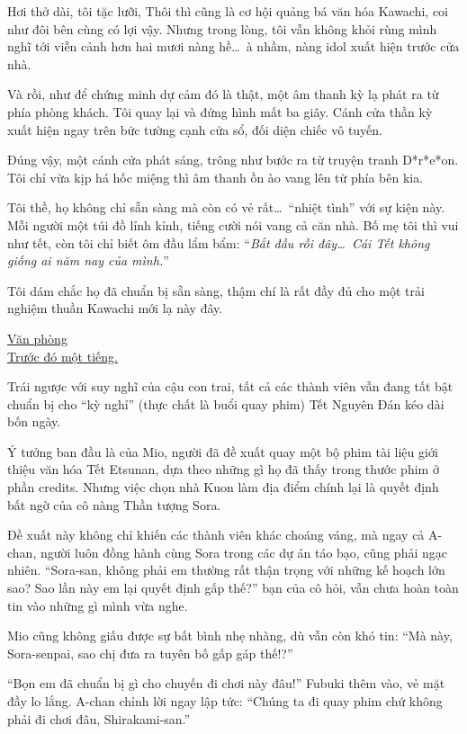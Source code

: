 \documentclass[../main.tex]{subfiles}
\begin{document}
Hơi thở dài, tôi tặc lưỡi, Thôi thì cũng là cơ hội quảng bá văn hóa Kawachi, coi như đôi bên cùng có lợi vậy. Nhưng trong lòng, tôi vẫn không khỏi rùng mình nghĩ tới viễn cảnh hơn hai mươi nàng hề\dots\ à nhầm, nàng idol xuất hiện trước cửa nhà.

Và rồi, như để chứng minh dự cảm đó là thật, một âm thanh kỳ lạ phát ra từ phía phòng khách. Tôi quay lại và đứng hình mất ba giây. Cánh cửa thần kỳ xuất hiện ngay trên bức tường cạnh cửa sổ, đối diện chiếc vô tuyến.

Đúng vậy, một cánh cửa phát sáng, trông như bước ra từ truyện tranh D*r*e*on. Tôi chỉ vừa kịp há hốc miệng thì âm thanh ồn ào vang lên từ phía bên kia.

Tôi thề, họ không chỉ sẵn sàng mà còn có vẻ rất\dots\ ``nhiệt tình'' với sự kiện này. Mỗi người một túi đồ lỉnh kỉnh, tiếng cười nói vang cả căn nhà. Bố mẹ tôi thì vui như tết, còn tôi chỉ biết ôm đầu lẩm bẩm: ``\textit{Bắt đầu rồi đây\dots\ Cái Tết không giống ai năm nay của mình.}''

Tôi dám chắc họ đã chuẩn bị sẵn sàng, thậm chí là rất đầy đủ cho một trải nghiệm thuần Kawachi mới lạ này đây.

\il

\begin{center}
    \pov{-}
    \uline{Văn phòng\\Trước đó một tiếng.}
\end{center}

Trái ngược với suy nghĩ của cậu con trai, tất cả các thành viên vẫn đang tất bật chuẩn bị cho ``kỳ nghỉ'' (thực chất là buổi quay phim) Tết Nguyên Đán kéo dài bốn ngày.

Ý tưởng ban đầu là của Mio, người đã đề xuất quay một bộ phim tài liệu giới thiệu văn hóa Tết Etsunan, dựa theo những gì họ đã thấy trong thước phim ở phần credits. Nhưng việc chọn nhà Kuon làm địa điểm chính lại là quyết định bất ngờ của cô nàng Thần tượng Sora.

Đề xuất này không chỉ khiến các thành viên khác choáng váng, mà ngay cả A-chan, người luôn đồng hành cùng Sora trong các dự án táo bạo, cũng phải ngạc nhiên. ``Sora-san, không phải em thường rất thận trọng với những kế hoạch lớn sao? Sao lần này em lại quyết định gấp thế?'' bạn của cô hỏi, vẫn chưa hoàn toàn tin vào những gì mình vừa nghe.

Mio cũng không giấu được sự bất bình nhẹ nhàng, dù vẫn còn khó tin: ``Mà này, Sora-senpai, sao chị đưa ra tuyên bố gấp gáp thế!?''

``Bọn em đã chuẩn bị gì cho chuyến đi chơi này đâu!'' Fubuki thêm vào, vẻ mặt đầy lo lắng. A-chan chỉnh lời ngay lập tức: ``Chúng ta đi quay phim chứ không phải đi chơi đâu, Shirakami-san.''
\end{document}
